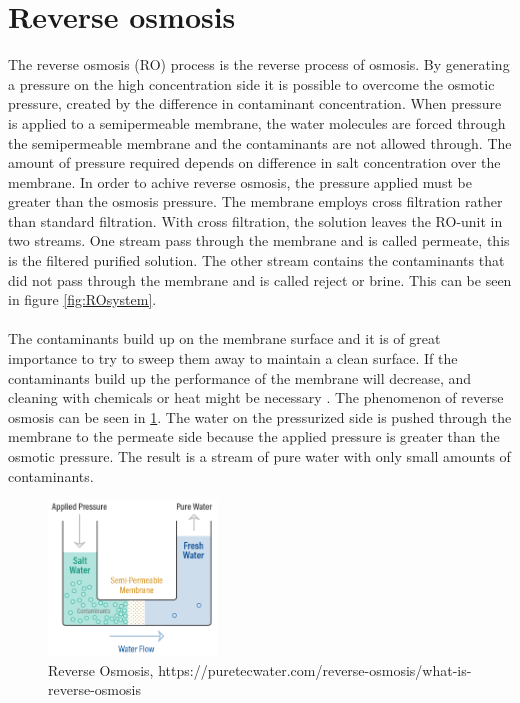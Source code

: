 \section{Reverse osmosis}
\label{RO}
The reverse osmosis (RO) process is the reverse process of osmosis. By generating a pressure on the high concentration side it is possible to overcome the osmotic pressure, created by the difference in contaminant concentration. When pressure is applied to a semipermeable membrane, the water molecules are forced through the semipermeable membrane and the contaminants are not allowed through. The amount of pressure required depends on difference in salt concentration over the membrane. In order to achive reverse osmosis, the pressure applied must be greater than the osmosis pressure. The membrane employs cross filtration rather than standard filtration. With cross filtration, the solution leaves the RO-unit in two streams. One stream pass through the membrane and is called permeate, this is the filtered purified solution. The other stream contains the contaminants that did not pass through the membrane and is called reject or brine. This can be seen in figure \ref{fig:ROsystem}. \\
\\
The contaminants build up on the membrane surface and it is of great importance to try to sweep them away to maintain a clean surface. If the contaminants build up the performance of the membrane will decrease, and cleaning with chemicals or heat might be necessary \cite{3}. The phenomenon of reverse osmosis can be seen in \ref{fig:ReverseOsmosis}. The water on the pressurized side is pushed through the membrane to the permeate side because the applied pressure is greater than the osmotic pressure. The result is a stream of pure water with only small amounts of contaminants. 
\begin{figure}[h]
    \centering
    \includegraphics[width=0.4\textwidth]{ReverseOsmosis}
    \caption{Reverse Osmosis, https://puretecwater.com/reverse-osmosis/what-is-reverse-osmosis}
    \label{fig:ReverseOsmosis}
\end{figure}


